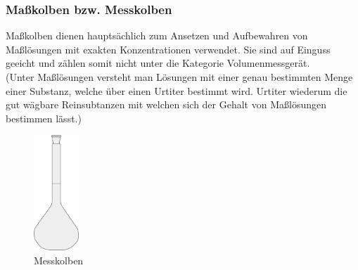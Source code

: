 \begin{table}[h!]
	\renewcommand*{\arraystretch}{1.2}
	\centering
	\caption{Vergleich von Becherglas, Rund- und Standkolben}
	\label{tab:vergleich_becherglas}
\end{table}%
\FloatBarrier

\newpage

\subsubsection{Maßkolben bzw. Messkolben}
Maßkolben dienen hauptsächlich zum Ansetzen und Aufbewahren von Maßlösungen mit exakten Konzentrationen verwendet. Sie sind auf Einguss geeicht und zählen somit nicht unter die Kategorie Volumenmessgerät.\\
(Unter Maßlösungen versteht man Lösungen mit einer genau bestimmten Menge einer Substanz, welche über einen Urtiter bestimmt wird. Urtiter wiederum die gut wägbare Reinsubtanzen mit welchen sich der Gehalt von Maßlösungen bestimmen lässt.)

\begin{figure}[h!]
	\centering
	\includegraphics[width=0.15\textwidth]{img/Messkolben}
	\caption{Messkolben}
	\label{fig:messkolben}
\end{figure}
\FloatBarrier


